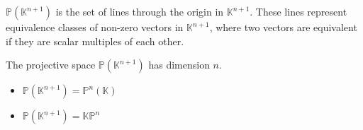 \documentclass[11pt,openany]{article}
\begin{document}
%		
%		
{}
\begin{remark*}
	$\mathbb{P}(\mathbb{K}^{n+1})$ is the set of lines through the origin in $\mathbb{K}^{n+1}$. These lines represent equivalence classes of non-zero vectors in $\mathbb{K}^{n+1}$, where two vectors are equivalent if they are scalar multiples of each other.
\end{remark*}
\begin{note}[Notation]
The projective space $\mathbb{P}(\mathbb{K}^{n+1})$ has dimension $n$. \begin{itemize}
	\item $\mathbb{P}(\mathbb{K}^{n+1}) = \mathbb{P}^n(\mathbb{K})$
	\item $\mathbb{P}(\mathbb{K}^{n+1}) = \mathbb{K}\mathbb{P}^n$
\end{itemize}
\end{note}
%	
%	
%	
%	
\end{document}
